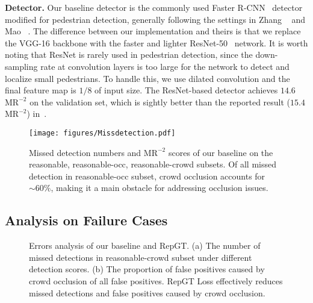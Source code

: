 \documentclass[10pt,twocolumn,letterpaper]{article}
\newcommand{\myparagraph}[1]{{\vspace{0.5em} \noindent \bf #1}}
\begin{document}
\myparagraph{Detector.}
Our baseline detector is the commonly used Faster R-CNN~\cite{NIPS2015_5638} detector modified for pedestrian detection, generally following the settings in Zhang \etal~\cite{zhang2016far} and Mao \etal~\cite{mao2017can}. The difference between our implementation and theirs is that we replace the VGG-16 backbone with the faster and lighter ResNet-50~\cite{he2016deep} network. It is worth noting that ResNet is rarely used in pedestrian detection, since the down-sampling rate at convolution layers is too large for the network to detect and localize small pedestrians. To handle this, we use dilated convolution and the final feature map is $1/8$ of input size. The ResNet-based detector achieves $14.6$ $\mathrm{MR}^{-2}$ on the validation set, which is sightly better than the reported result ($15.4$ $\mathrm{MR}^{-2}$) in~\cite{zhang2017citypersons}.

\begin{figure}[t]
\texttt{[image: figures/Missdetection.pdf]}
\caption{Missed detection numbers and $\mathrm{MR}^{-2}$ scores of our baseline on the reasonable, reasonable-occ, reasonable-crowd subsets. Of all missed detection in reasonable-occ subset, crowd occlusion accounts for ${\sim}60\%$, making it a main obstacle for addressing occlusion issues.}
\label{fig:missdetection}
\end{figure}

\subsection{Analysis on Failure Cases}

\begin{figure}[!tbp]
\centering
{}
\caption{Errors analysis of our baseline and RepGT. (a) The number of missed detections in reasonable-crowd subset under different detection scores. (b) The proportion of false positives caused by crowd occlusion of all false positives. RepGT Loss effectively reduces missed detections and false positives caused by crowd occlusion.}
\vspace{-0.2cm}
\label{fig:crowderrors}
\end{figure}
\end{document}
